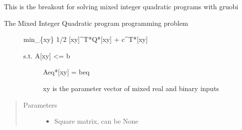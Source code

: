 \documentclass[letterpaper,10pt,english]{sphinxmanual}
\begin{document}
\begin{fulllineitems}
\label{\detokenize{mpo.solver_interface:mpo.solver_interface.gurobi_solver_interface.solve_miqp_gurobi}}
\sphinxAtStartPar
This is the breakout for solving mixed integer quadratic programs with gruobi
\begin{description}
\item[{The Mixed Integer Quadratic program programming problem}] \leavevmode
\sphinxAtStartPar
min\_\{xy\} 1/2 {[}xy{]}\textasciicircum{}T*Q*{[}xy{]} + c\textasciicircum{}T*{[}xy{]}
\begin{description}
\item[{s.t.   A{[}xy{]} \textless{}= b}] \leavevmode
\sphinxAtStartPar
Aeq*{[}xy{]} = beq

\sphinxAtStartPar
xy is the parameter vector of mixed real and binary inputs

\end{description}

\end{description}
\begin{quote}\begin{description}
\item[{Parameters}] \leavevmode\begin{itemize}
\item {} 
\sphinxAtStartPar
{} \textendash{} Square matrix, can be None


\end{itemize}
\end{description}
\end{quote}
\end{fulllineitems}
\end{document}
